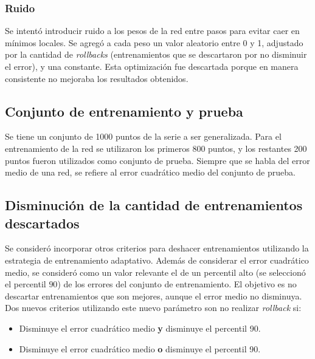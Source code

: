 \documentclass[a4paper,10pt]{article}
\begin{document}
        \subsubsection{Ruido}

        Se intentó introducir ruido a los pesos de la red entre pasos para
        evitar caer en mínimos locales.
        Se agregó a cada peso un valor aleatorio entre 0 y 1, adjustado por la
        cantidad de \textit{rollbacks} (entrenamientos que se descartaron por no
        disminuir el error), y una constante.
        Esta optimización fue descartada porque en manera consistente no
        mejoraba los resultados obtenidos.

    \subsection{Conjunto de entrenamiento y prueba}

    Se tiene un conjunto de 1000 puntos de la serie a ser generalizada.
    Para el entrenamiento de la red se utilizaron los primeros 800 puntos,
    y los restantes 200 puntos fueron utilizados como conjunto de prueba.
    Siempre que se habla del error medio de una red, se refiere al error
    cuadrático medio del conjunto de prueba.

    \subsection{Disminución de la cantidad de entrenamientos descartados}
        \label{less_rollbacks}
        Se consideró incorporar otros criterios para deshacer entrenamientos utilizando la estrategia de entrenamiento adaptativo. Además de considerar el error cuadrático medio, 
        se consideró como un valor relevante el de un percentil alto (se seleccionó el percentil $90$) de los errores del conjunto de entrenamiento. El objetivo es no descartar 
        entrenamientos que son mejores, aunque el error medio no disminuya. Dos
        nuevos criterios utilizando este nuevo parámetro son no realizar
        \textit{rollback} si:

        \begin{itemize}
            \item Disminuye el error cuadrático medio \textbf{y} disminuye el percentil 90.
            \item Disminuye el error cuadrático medio \textbf{o} disminuye el percentil 90.
        \end{itemize}
\end{document}
